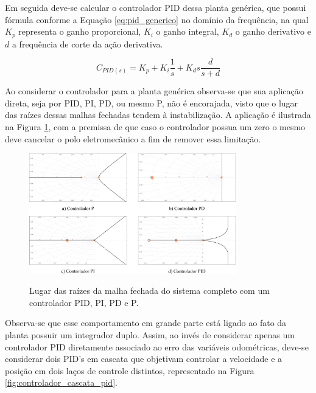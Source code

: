 \documentclass[main.tex]{subfiles}
\begin{document}
	Em seguida deve-se calcular o controlador PID dessa planta genérica, que possui fórmula conforme a Equação \ref{eq:pid_generico} no domínio da frequência, na qual $K_p$ representa o ganho proporcional, $K_i$ o ganho integral, $K_d$ o ganho derivativo e $d$ a frequência de corte da ação derivativa.
	
	\begin{equation}\label{eq:pid_generico}
		C_{PID(s)} = K_p + K_i\frac{1}{s} + K_ds\frac{d}{s + d}
	\end{equation}
	
	Ao considerar o controlador para a planta genérica observa-se que sua aplicação direta, seja por PID, PI, PD, ou mesmo P, não é encorajada, visto que o lugar das raízes dessas malhas fechadas tendem à instabilização. A aplicação é ilustrada na Figura \ref{fig:lugar_raizes_ruim}, com a premissa de que caso o controlador possua um zero o mesmo deve cancelar o polo eletromecânico a fim de remover essa limitação.
	
	\begin{figure}[!h]
		\centering
		\caption{Lugar das raízes da malha fechada do sistema completo com um controlador PID, PI, PD e P.}
		\includegraphics[width=0.8\textwidth]{capitulos/controle_atitude/imgs/lugar_raizes_ruim.png}
		\label{fig:lugar_raizes_ruim}
	\end{figure}
	
	
	Observa-se que esse comportamento em grande parte está ligado ao fato da planta possuir um integrador duplo. Assim, ao invés de considerar apenas um controlador PID diretamente associado ao erro das variáveis odométricas, deve-se considerar dois PID's em cascata que objetivam controlar a velocidade e a posição em dois laços de controle distintos, representado na Figura \ref{fig:controlador_cascata_pid}. 
	
\end{document}
